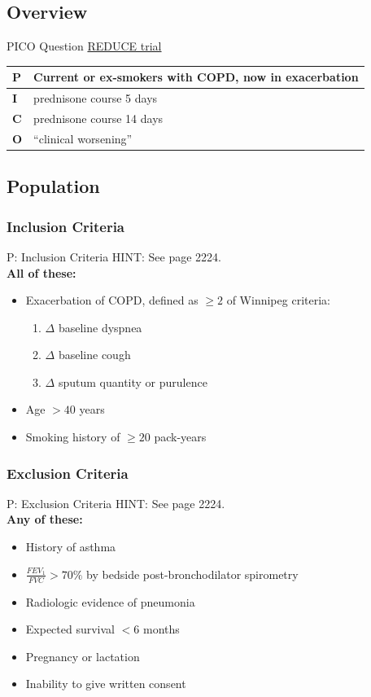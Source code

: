 \documentclass{beamer}
\newcommand{\pro}{\textcolor{blue}}
\newcommand{\reduce}{\href{https://doi.org/10.1001/jama.2013.5023}{REDUCE trial}}
\begin{document}
	\subsection{Overview}
		\begin{frame}{PICO Question}
			\centering
			\pro{\reduce}
			\begin{tabular}{l | l}
				\hline
				\textbf{P} & Current or ex-smokers with COPD, now in exacerbation \\
				\hline
				\textbf{I} & prednisone course 5 days \\
				\hline
				\textbf{C} & prednisone course 14 days \\
				\hline
				\textbf{O} & ``clinical worsening'' \\
				\hline
			\end{tabular}
		\end{frame}
	\subsection{Population}
		\subsubsection{Inclusion Criteria}
		\begin{frame}{P: Inclusion Criteria}
			HINT: See page 2224. \\
			\pause
			\textbf{All of these:}
					\begin{itemize}
					\item Exacerbation of COPD, defined as $\geq 2$ of Winnipeg criteria:
					\begin{enumerate}
						\item $\Delta$ baseline dyspnea
						\item $\Delta$ baseline cough
						\item $\Delta$ sputum quantity or purulence
					\end{enumerate}
					\item Age $>40$ years
					\item Smoking history of $\geq 20$ pack-years
				\end{itemize}
		\end{frame}
		\subsubsection{Exclusion Criteria}
			\begin{frame}{P: Exclusion Criteria}
				HINT: See page 2224. \\
				\pause
				\textbf{Any of these:}
				\begin{itemize}
					\item History of asthma
					\item $\frac{FEV_1}{FVC} >70\%$ by bedside post-bronchodilator spirometry 
					\item Radiologic evidence of pneumonia
					\item Expected survival $<6$ months
					\item Pregnancy or lactation
					\item Inability to give written consent
				\end{itemize}
			\end{frame}
\end{document}
